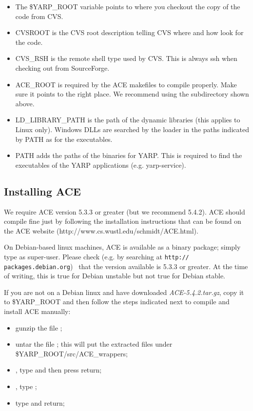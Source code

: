 \begin{itemize}

\item The \$YARP\_ROOT variable points to where you checkout the copy of the code from CVS.

\item CVSROOT is the CVS root description telling CVS where and how look for the code.

\item CVS\_RSH is the remote shell type used by CVS. This is always ssh when checking out from SourceForge.

\item ACE\_ROOT is required by the ACE makefiles to compile properly. Make sure it points to the right place. We recommend using the subdirectory shown above.

\item LD\_LIBRARY\_PATH is the path of the dynamic libraries (this applies to Linux only). Windows DLLs are searched by the loader in the paths indicated by PATH as for the executables.

\item PATH adds the paths of the binaries for YARP. This is required to find the executables of the YARP applications (e.g. yarp-service).

\end{itemize}

\subsection{Installing ACE}
We require ACE version 5.3.3 or greater (but we recommend 5.4.2). ACE should compile fine just by following the installation instructions that can be found on the ACE website (http://www.cs.wustl.edu/schmidt/ACE.html). 

On Debian-based linux machines, ACE is available as a binary package; simply type  as super-user.  Please check (e.g. by searching at {\tt http:// packages.debian.org}) ~that the version available is 5.3.3 or greater.  At the time of writing, this is true for Debian unstable but not true for Debian stable.

If you are not on a Debian linux and have downloaded {\em ACE-5.4.2.tar.gz}, copy it to \$YARP\_ROOT and then follow the steps indicated next to compile and install ACE manually:
\begin{itemize}
\item gunzip the file ;
\item untar the file ; this will put the extracted files under \$YARP\_ROOT/src/ACE\_wrappers;
\item {}, type  and then press return;
\item {}, type ;
\item type  and return;
\end{itemize}

